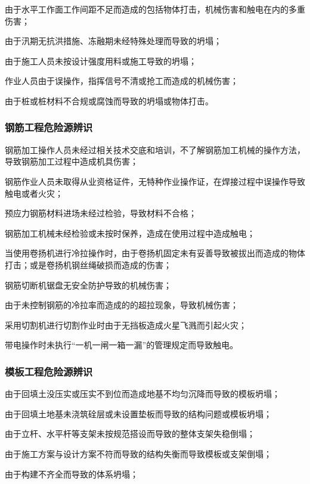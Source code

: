  由于水平工作面工作间距不足而造成的包括物体打击，机械伤害和触电在内的多重伤害；

 由于汛期无抗洪措施、冻融期未经特殊处理而导致的坍塌；

 由于施工人员未按设计强度用料或施工导致的坍塌；

 作业人员由于误操作，指挥信号不清或抢工而造成的机械伤害；

 由于桩或桩材料不合规或腐蚀而导致的坍塌或物体打击。

\subsubsection{钢筋工程危险源辨识}

 钢筋加工操作人员未经过相关技术交底和培训，不了解钢筋加工机械的操作方法，导致钢筋加工过程中造成机具伤害；

 钢筋作业人员未取得从业资格证件，无特种作业操作证，在焊接过程中误操作导致触电或者火灾；

 预应力钢筋材料进场未经过检验，导致材料不合格；

 钢筋加工机械未经检验或未按时保养，造成在使用过程中造成触电；

 当使用卷扬机进行冷拉操作时，由于卷扬机固定未有妥善导致被拔出而造成的物体打击；或是卷扬机钢丝绳破损而造成的伤害；

 钢筋切断机锯盘无安全防护导致的机械伤害；

 由于未控制钢筋的冷拉率而造成的的超拉现象，导致机械伤害；

 采用切割机进行切割作业时由于无挡板造成火星飞溅而引起火灾；

 带电操作时未执行“一机一闸一箱一漏”的管理规定而导致触电。

\subsubsection{模板工程危险源辨识}

 由于回填土没压实或压实不到位而造成地基不均匀沉降而导致的模板坍塌；

 由于回填土地基未浇筑硂层或未设置垫板而导致的结构问题或模板坍塌；

 由于立杆、水平杆等支架未按规范搭设而导致的整体支架失稳倒塌；

 由于施工方案与设计方案不符而导致的结构失衡而导致模板或支架倒塌；

 由于构建不齐全而导致的体系坍塌；

